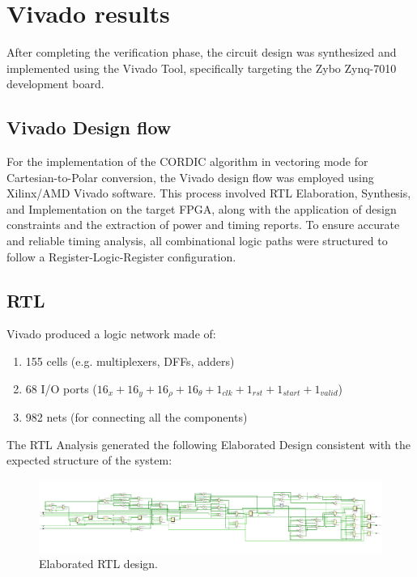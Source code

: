 \chapter{Vivado results}
After completing the verification phase, the circuit design was synthesized and implemented using the Vivado Tool, specifically targeting the Zybo Zynq-7010 development board.

\section{Vivado Design flow}
For the implementation of the CORDIC algorithm in vectoring mode for Cartesian-to-Polar conversion, the Vivado design flow was employed using Xilinx/AMD Vivado software. This process involved RTL Elaboration, Synthesis, and Implementation on the target FPGA, along with the application of design constraints and the extraction of power and timing reports. To ensure accurate and reliable timing analysis, all combinational logic paths were structured to follow a Register-Logic-Register configuration.

\section{RTL}
Vivado produced a logic network made of:

\begin{enumerate}
    \item 155 cells (e.g. multiplexers, DFFs, adders)
    \item 68 I/O ports ($16_{x} + 16_{y} + 16_{\rho} + 16_{\theta} + 1_{clk} + 1_{rst} + 1_{start} + 1_{valid}$)
    \item 982 nets (for connecting all the components)
\end{enumerate}

The RTL Analysis generated the following Elaborated Design consistent with the expected structure of the system:
\begin{figure}[H]
    \centering
    \includegraphics[width=\textwidth]{./images/Synthesis/schematic.pdf}
    \caption{Elaborated RTL design.}
    \label{fig:schematic}
\end{figure}

